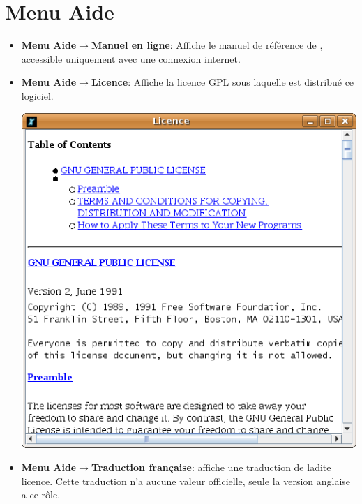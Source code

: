 \section{Menu \og Aide \fg}
\begin{itemize}
\item \textbf{Menu Aide$\to$Manuel en ligne}: Affiche le manuel de référence de \xlogo, accessible uniquement avec une connexion internet. 
	\vspace{0.25cm}
\item \textbf{Menu Aide$\to$Licence}: Affiche la licence GPL sous laquelle est distribué ce logiciel.
	\begin{center}
 		\includegraphics[scale=0.4]{images/CaptureLicence.png}
	\end{center}
	\vspace{0.25cm}
\item \textbf{Menu Aide$\to$Traduction française}: affiche une traduction de ladite licence. Cette traduction n'a aucune valeur officielle, seule la version anglaise
a ce rôle.


\end{itemize}
